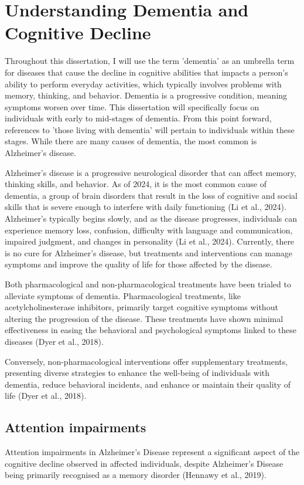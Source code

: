 \documentclass{l4proj}
\begin{document}
\section{Understanding Dementia and Cognitive Decline}

Throughout this dissertation, I will use the term 'dementia' as an umbrella term for diseases that cause the decline in cognitive abilities that impacts a person's ability to perform everyday activities, which typically involves problems with memory, thinking, and behavior. Dementia is a progressive condition, meaning symptoms worsen over time. This dissertation will specifically focus on individuals with early to mid-stages of dementia. From this point forward, references to 'those living with dementia' will pertain to individuals within these stages. While there are many causes of dementia, the most common is Alzheimer's disease.

Alzheimer's disease is a progressive neurological disorder that can affect memory, thinking skills, and behavior. As of 2024, it is the most common cause of dementia, a group of brain disorders that result in the loss of cognitive and social skills that is severe enough to interfere with daily functioning (Li et al., 2024). Alzheimer's typically begins slowly, and as the disease progresses, individuals can experience memory loss, confusion, difficulty with language and communication, impaired judgment, and changes in personality (Li et al., 2024). Currently, there is no cure for Alzheimer's disease, but treatments and interventions can manage symptoms and improve the quality of life for those affected by the disease.

Both pharmacological and non-pharmacological treatments have been trialed to alleviate symptoms of dementia. Pharmacological treatments, like acetylcholinesterase inhibitors, primarily target cognitive symptoms without altering the progression of the disease. These treatments have shown minimal effectiveness in easing the behavioral and psychological symptoms linked to these diseases (Dyer et al., 2018).

Conversely, non-pharmacological interventions offer supplementary treatments, presenting diverse strategies to enhance the well-being of individuals with dementia, reduce behavioral incidents, and enhance or maintain their quality of life (Dyer et al., 2018).

\subsection{Attention impairments}\label{sec:attention}
Attention impairments in Alzheimer’s Disease represent a significant aspect of the cognitive decline observed in affected individuals, despite Alzheimer’s Disease being primarily recognised as a memory disorder (Hennawy et al., 2019).
\end{document}
